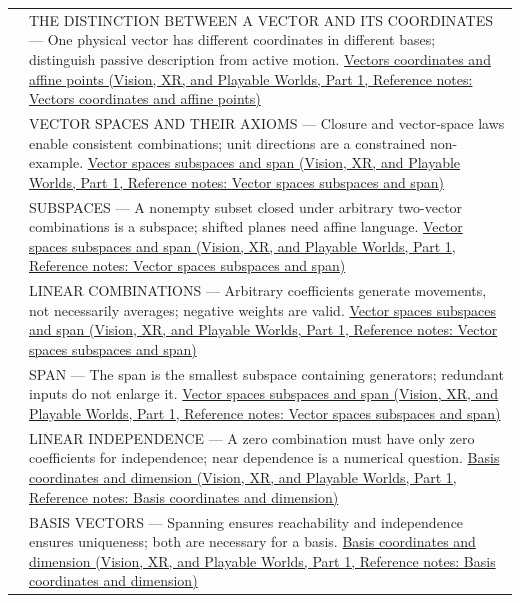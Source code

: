 {\begin{longtable}[]{@{}
  >{\raggedright\arraybackslash}p{}
  >{\raggedright\arraybackslash}p{}@{}}
506 & THE DISTINCTION BETWEEN A VECTOR AND ITS COORDINATES --- One physical vector has different coordinates in different bases; distinguish passive description from active motion. \href{../07-Vision-XR-and-Playable-Worlds-P01/main.pdf\#appendix-0659864c0aa3}{Vectors coordinates and affine points (Vision, XR, and Playable Worlds, Part 1, Reference notes: Vectors coordinates and affine points)} \\
507 & VECTOR SPACES AND THEIR AXIOMS --- Closure and vector-space laws enable consistent combinations; unit directions are a constrained non-example. \href{../07-Vision-XR-and-Playable-Worlds-P01/main.pdf\#appendix-173b52c063ae}{Vector spaces subspaces and span (Vision, XR, and Playable Worlds, Part 1, Reference notes: Vector spaces subspaces and span)} \\
508 & SUBSPACES --- A nonempty subset closed under arbitrary two-vector combinations is a subspace; shifted planes need affine language. \href{../07-Vision-XR-and-Playable-Worlds-P01/main.pdf\#appendix-173b52c063ae}{Vector spaces subspaces and span (Vision, XR, and Playable Worlds, Part 1, Reference notes: Vector spaces subspaces and span)} \\
509 & LINEAR COMBINATIONS --- Arbitrary coefficients generate movements, not necessarily averages; negative weights are valid. \href{../07-Vision-XR-and-Playable-Worlds-P01/main.pdf\#appendix-173b52c063ae}{Vector spaces subspaces and span (Vision, XR, and Playable Worlds, Part 1, Reference notes: Vector spaces subspaces and span)} \\
510 & SPAN --- The span is the smallest subspace containing generators; redundant inputs do not enlarge it. \href{../07-Vision-XR-and-Playable-Worlds-P01/main.pdf\#appendix-173b52c063ae}{Vector spaces subspaces and span (Vision, XR, and Playable Worlds, Part 1, Reference notes: Vector spaces subspaces and span)} \\
511 & LINEAR INDEPENDENCE --- A zero combination must have only zero coefficients for independence; near dependence is a numerical question. \href{../07-Vision-XR-and-Playable-Worlds-P01/main.pdf\#appendix-ce0341f7ea0d}{Basis coordinates and dimension (Vision, XR, and Playable Worlds, Part 1, Reference notes: Basis coordinates and dimension)} \\
512 & BASIS VECTORS --- Spanning ensures reachability and independence ensures uniqueness; both are necessary for a basis. \href{../07-Vision-XR-and-Playable-Worlds-P01/main.pdf\#appendix-ce0341f7ea0d}{Basis coordinates and dimension (Vision, XR, and Playable Worlds, Part 1, Reference notes: Basis coordinates and dimension)} \\

\end{longtable}}
